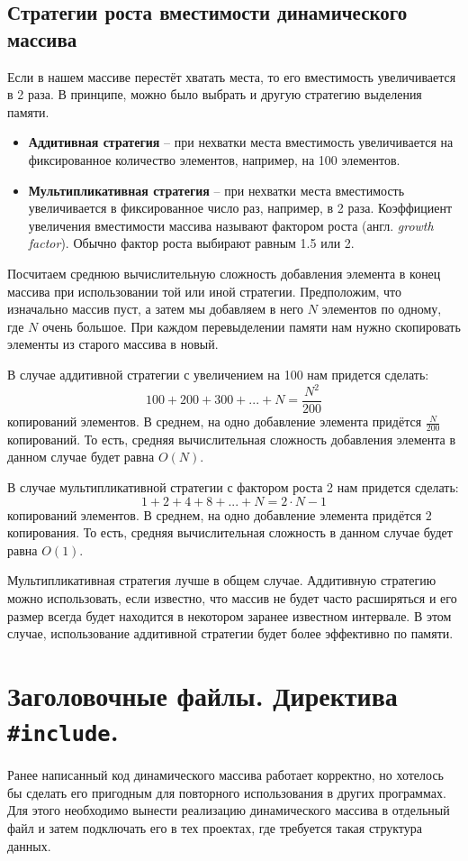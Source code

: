 \documentclass[10pt]{article}
\begin{document}
\subsection*{Стратегии роста вместимости динамического массива}
Если в нашем массиве перестёт хватать места, то его вместимость увеличивается в 2 раза. В принципе, можно было выбрать и другую стратегию выделения памяти.

\begin{itemize}
\item \textbf{Аддитивная стратегия} -- при нехватки места вместимость увеличивается на фиксированное количество элементов, например, на 100 элементов.
\item \textbf{Мультипликативная стратегия} -- при нехватки места вместимость увеличивается в фиксированное число раз, например, в 2 раза. Коэффициент увеличения вместимости массива называют фактором роста (англ. \textit{growth factor}). Обычно фактор роста выбирают равным 1.5 или 2.
\end{itemize}
Посчитаем среднюю вычислительную сложность добавления элемента в конец массива при использовании той или иной стратегии. Предположим, что изначально массив пуст, а затем мы добавляем в него $N$ элементов по одному, где $N$ очень большое. При каждом перевыделении памяти нам нужно скопировать элементы из старого массива в новый. 

В случае аддитивной стратегии с увеличением на 100 нам придется сделать:
$$
100 + 200 + 300 + ... + N = \frac{N^2}{200} 
$$
копирований элементов. В среднем, на одно добавление элемента придётся $\frac{N}{200}$ копирований. То есть, средняя вычислительная сложность добавления элемента в данном случае будет равна $O(N)$.

В случае мультипликативной стратегии с фактором роста 2 нам придется сделать:
$$
1 + 2 + 4 + 8 + ... + N = 2 \cdot N - 1
$$
копирований элементов. В среднем, на одно добавление элемента придётся $2$ копирования. То есть, средняя вычислительная сложность в данном случае будет равна $O(1)$.

Мультипликативная стратегия лучше в общем случае. Аддитивную стратегию можно использовать, если известно, что массив не будет часто расширяться и его размер всегда будет находится в некотором заранее известном интервале. В этом случае, использование аддитивной стратегии будет более эффективно по памяти.



\newpage
\section*{Заголовочные файлы. Директива \texttt{\#include}.}
Ранее написанный код динамического массива работает корректно, но хотелось бы сделать его пригодным для повторного использования в других программах. Для этого необходимо вынести реализацию динамического массива в отдельный файл и затем подключать его в тех проектах, где требуется такая структура данных.
\end{document}
